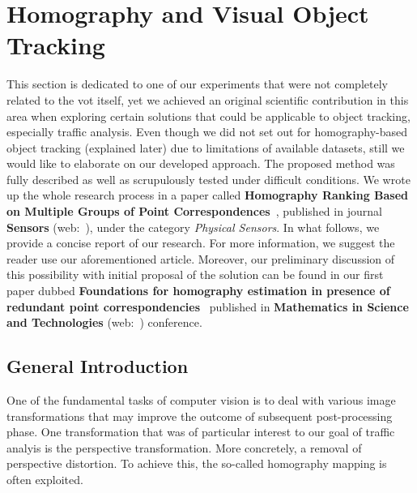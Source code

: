 \section{Homography and Visual Object Tracking}
\label{sec:HomographyAndVisualObjectTracking}

This section is dedicated to one of our experiments that were not completely related to the \gls{vot} itself, yet we achieved an original scientific contribution in this area when exploring certain solutions that could be applicable to object tracking, especially traffic analysis. Even though we did not set out for homography-based object tracking (explained later) due to limitations of available datasets, still we would like to elaborate on our developed approach. The proposed method was fully described as well as scrupulously tested under difficult conditions. We wrote up the whole research process in a paper called \textbf{Homography Ranking Based on Multiple Groups of Point Correspondences}~\cite{ondrasovic2021homography}, published in journal \textbf{Sensors} (web:~\cite{sensors}), under the category \emph{Physical Sensors}. In what follows, we provide a concise report of our research. For more information, we suggest the reader use our aforementioned article. Moreover, our preliminary discussion of this possibility with initial proposal of the solution can be found in our first paper dubbed \textbf{Foundations for homography estimation in presence of redundant point correspondencies}~\cite{ondravsovivc2020foundations} published in \textbf{Mathematics in Science and Technologies} (web:~\cite{mistconf}) conference.

\subsection{General Introduction}

One of the fundamental tasks of computer vision is to deal with various image transformations that may improve the outcome of subsequent post-processing phase. One transformation that was of particular interest to our goal of traffic analyis is the perspective transformation. More concretely, a removal of perspective distortion. To achieve this, the so-called homography mapping is often exploited.

